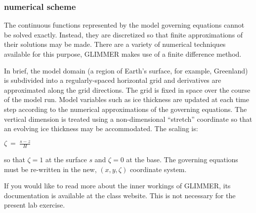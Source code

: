 \subsubsection{numerical scheme}

The continuous functions represented by the model governing equations
cannot be solved exactly. Instead, they are discretized so that finite
approximations of their solutions may be made. There are a variety of
numerical techniques available for this purpose, GLIMMER makes use of a
finite difference method.

In brief, the model domain (a region of Earth's surface, for example,
Greenland) is subdivided into a regularly-spaced horizontal grid and
derivatives are approximated along the grid directions. The grid is
fixed in space over the course of the model run. Model variables such as
ice thickness are updated at each time step according to the numerical
approximations of the governing equations. The vertical dimension is
treated using a non-dimensional ``stretch'' coordinate so that an
evolving ice thickness may be accommodated. The scaling is:

$
\zeta~=~\frac{s-z}{H}
$

so that $\zeta=1$ at the surface $s$ and $\zeta=0$ at the base. The
governing equations must be re-written in the new, $(x, y, \zeta)$
coordinate system.

If you would like to read more about the inner workings of GLIMMER, its
documentation is available at the class website. This is not necessary
for the present lab exercise.






